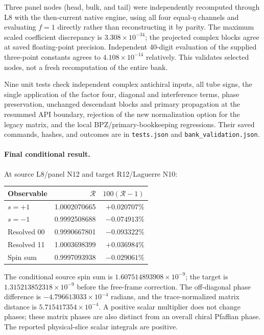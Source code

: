 Three panel nodes (head, bulk, and tail) were independently
recomputed through L8 with the then-current native engine,
using all four equal-$\eta$ channels and evaluating $f=1$
directly rather than reconstructing it by parity. The maximum
scaled coefficient discrepancy is $3.308\times10^{-34}$;
the projected complex blocks agree at saved floating-point
precision. Independent 40-digit evaluation of the supplied
three-point constants agrees to $4.108\times10^{-14}$ relatively.
This validates selected nodes, not a fresh recomputation of
the entire bank.

Nine unit tests check independent complex antichiral inputs,
all tube signs, the single application of the factor four,
diagonal and interference terms, phase preservation, unchanged
descendant blocks and primary propagation at the resummed API
boundary, rejection of the new normalization option for the
legacy matrix, and the local BPZ/primary-bookkeeping regressions.
Their saved commands, hashes, and outcomes are in
\texttt{tests.json} and \texttt{bank\_validation.json}.

\paragraph{Final conditional result.}
At source L8/panel N12 and target R12/Laguerre N10:
\begin{center}
\begin{tabular}{lrr}
\toprule
Observable & $\mathcal R$ & $100(\mathcal R-1)$\\
\midrule
$s=+1$ & 1.0002070665 & $+0.020707\%$\\
$s=-1$ & 0.9992508688 & $-0.074913\%$\\
Resolved 00 & 0.9990667801 & $-0.093322\%$\\
Resolved 11 & 1.0003698399 & $+0.036984\%$\\
Spin sum & 0.9997093938 & $-0.029061\%$\\
\bottomrule
\end{tabular}
\end{center}
The conditional source spin sum is
$1.607514893908\times10^{-9}$; the target is
$1.315213852318\times10^{-9}$ before the free-frame correction.
The off-diagonal phase difference is
$-4.796613033\times10^{-4}$ radians, and the
trace-normalized matrix distance is $5.715417354\times10^{-4}$.
A positive scalar multiplier does not change phases; these
matrix phases are also distinct from an overall chiral
Pfaffian phase. The reported physical-slice scalar integrals
are positive.

